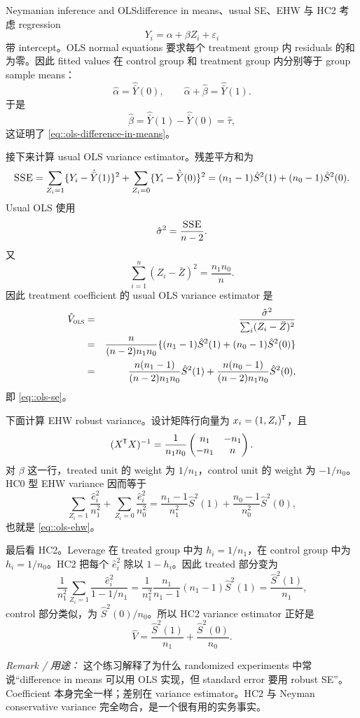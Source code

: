 \begin{exercisesolution}{Neymanian inference and OLS}{difference in means、usual SE、EHW 与 HC2}
考虑 regression
\[
Y_i=\alpha+\beta Z_i+\varepsilon_i
\]
带 intercept。OLS normal equations 要求每个 treatment group 内 residuals 的和为零。因此 fitted values 在 control group 和 treatment group 内分别等于 group sample means：
\[
\hat\alpha=\hat{\bar Y}(0),\qquad
\hat\alpha+\hat\beta=\hat{\bar Y}(1).
\]
于是
\[
\hat\beta=\hat{\bar Y}(1)-\hat{\bar Y}(0)=\hat\tau,
\]
这证明了 \cref{eq::ols-difference-in-means}。

接下来计算 usual OLS variance estimator。残差平方和为
\[
\textsc{SSE}
=\sum_{Z_i=1}\{Y_i-\hat{\bar Y}(1)\}^2
+\sum_{Z_i=0}\{Y_i-\hat{\bar Y}(0)\}^2
=(n_1-1)\hat S^2(1)+(n_0-1)\hat S^2(0).
\]
Usual OLS 使用
\[
\hat\sigma^2=\frac{\textsc{SSE}}{n-2}.
\]
又
\[
\sum_{i=1}^n(Z_i-\bar Z)^2=\frac{n_1n_0}{n}.
\]
因此 treatment coefficient 的 usual OLS variance estimator 是
\begin{eqnarray*}
\hat V_{\textsc{ols}}
&=&\frac{\hat\sigma^2}{\sum_i(Z_i-\bar Z)^2}\\
&=&\frac{n}{(n-2)n_1n_0}
\{(n_1-1)\hat S^2(1)+(n_0-1)\hat S^2(0)\}\\
&=&
\frac{n(n_1-1)}{(n-2)n_1n_0}\hat S^2(1)
+\frac{n(n_0-1)}{(n-2)n_1n_0}\hat S^2(0),
\end{eqnarray*}
即 \cref{eq::ols-se}。

下面计算 EHW robust variance。设计矩阵行向量为 $x_i=(1,Z_i)^{\mkern-1.5mu\mathsf{T}}$，且
\[
(X^{\mkern-1.5mu\mathsf{T}} X)^{-1}
=\frac{1}{n_1n_0}
\begin{pmatrix}
n_1&-n_1\\
-n_1&n
\end{pmatrix}.
\]
对 $\beta$ 这一行，treated unit 的 weight 为 $1/n_1$，control unit 的 weight 为 $-1/n_0$。HC0 型 EHW variance 因而等于
\[
\sum_{Z_i=1}\frac{\hat e_i^2}{n_1^2}
+\sum_{Z_i=0}\frac{\hat e_i^2}{n_0^2}
=\frac{n_1-1}{n_1^2}\hat S^2(1)
+\frac{n_0-1}{n_0^2}\hat S^2(0),
\]
也就是 \cref{eq::ols-ehw}。

最后看 HC2。Leverage 在 treated group 中为 $h_i=1/n_1$，在 control group 中为 $h_i=1/n_0$。HC2 把每个 $\hat e_i^2$ 除以 $1-h_i$。因此 treated 部分变为
\[
\frac{1}{n_1^2}\sum_{Z_i=1}\frac{\hat e_i^2}{1-1/n_1}
=\frac{1}{n_1^2}\frac{n_1}{n_1-1}(n_1-1)\hat S^2(1)
=\frac{\hat S^2(1)}{n_1},
\]
control 部分类似，为 $\hat S^2(0)/n_0$。所以 HC2 variance estimator 正好是
\[
\hat V=\frac{\hat S^2(1)}{n_1}+\frac{\hat S^2(0)}{n_0}.
\]

\emph{Remark / 用途：} 这个练习解释了为什么 randomized experiments 中常说“difference in means 可以用 OLS 实现，但 standard error 要用 robust SE”。Coefficient 本身完全一样；差别在 variance estimator。HC2 与 Neyman conservative variance 完全吻合，是一个很有用的实务事实。
\end{exercisesolution}

